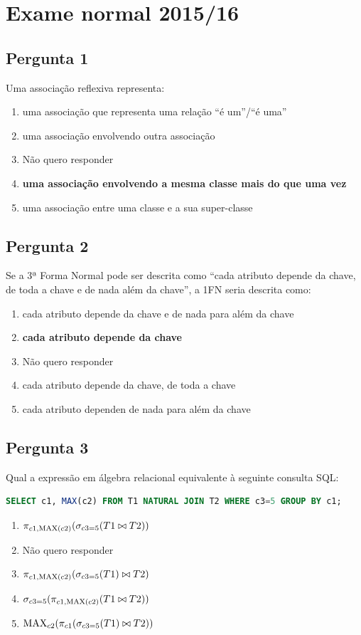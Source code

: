 {
\renewcommand{\thechapter}{\arabic{chapter}N}
\setcounter{chapter}{15}
\chapter{Exame normal 2015/16}
\section{Pergunta 1}
Uma associação reflexiva representa:
\begin{enumerate}[label=\alph*.]\itemsep0em
    \item uma associação que representa uma relação ``é um''/``é uma''
    \item uma associação envolvendo outra associação
    \item Não quero responder
    \item \textbf{uma associação envolvendo a mesma classe mais do que uma vez \greencheckmark}
    \item uma associação entre uma classe e a sua super-classe
\end{enumerate}

\section{Pergunta 2}
Se a 3ª Forma Normal pode ser descrita como ``cada atributo depende da chave, de toda a chave e de nada além da chave'', a 1FN seria descrita como:
\begin{enumerate}[label=\alph*.]\itemsep0em
    \item cada atributo depende da chave e de nada para além da chave
    \item \textbf{cada atributo depende da chave \greencheckmark}
    \item Não quero responder
    \item cada atributo depende da chave, de toda a chave
    \item cada atributo dependen de nada para além da chave
\end{enumerate}

\section{Pergunta 3}
Qual a expressão em álgebra relacional equivalente à seguinte consulta SQL:
\begin{lstlisting}[language=SQL]
SELECT c1, MAX(c2) FROM T1 NATURAL JOIN T2 WHERE c3=5 GROUP BY c1;
\end{lstlisting}
\begin{enumerate}[label=\alph*.]\itemsep0em
    \item $\pi_{c1, \text{MAX}(c2)}(\sigma_{c3=5}(T1 \bowtie T2))$ \greencheckmark
    \item Não quero responder
    \item $\pi_{c1,\text{MAX}(c2)}(\sigma_{c3=5}(T1) \bowtie T2)$
    \item $\sigma_{c3=5}(\pi_{c1,\text{MAX}(c2)}(T1 \bowtie T2))$
    \item $\text{MAX}_{c2}(\pi_{c1}(\sigma_{c3=5}(T1) \bowtie T2))$
\end{enumerate}

}
